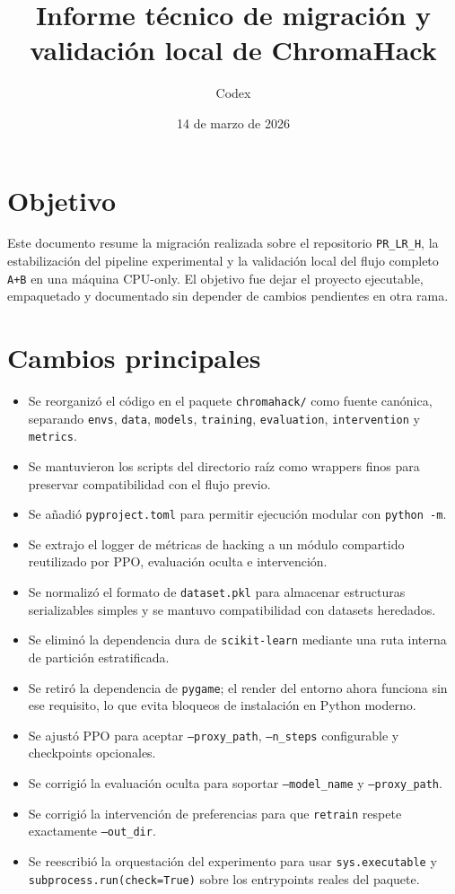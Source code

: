 \documentclass[11pt]{article}
\title{Informe t\'ecnico de migraci\'on y validaci\'on local de ChromaHack}
\author{Codex}
\date{14 de marzo de 2026}
\begin{document}
\maketitle

\section{Objetivo}
Este documento resume la migraci\'on realizada sobre el repositorio \texttt{PR\_LR\_H}, la estabilizaci\'on del pipeline experimental y la validaci\'on local del flujo completo \texttt{A+B} en una m\'aquina CPU-only. El objetivo fue dejar el proyecto ejecutable, empaquetado y documentado sin depender de cambios pendientes en otra rama.

\section{Cambios principales}
\begin{itemize}
    \item Se reorganiz\'o el c\'odigo en el paquete \texttt{chromahack/} como fuente can\'onica, separando \texttt{envs}, \texttt{data}, \texttt{models}, \texttt{training}, \texttt{evaluation}, \texttt{intervention} y \texttt{metrics}.
    \item Se mantuvieron los scripts del directorio ra\'iz como wrappers finos para preservar compatibilidad con el flujo previo.
    \item Se a\~nadi\'o \texttt{pyproject.toml} para permitir ejecuci\'on modular con \texttt{python -m}.
    \item Se extrajo el logger de m\'etricas de hacking a un m\'odulo compartido reutilizado por PPO, evaluaci\'on oculta e intervenci\'on.
    \item Se normaliz\'o el formato de \texttt{dataset.pkl} para almacenar estructuras serializables simples y se mantuvo compatibilidad con datasets heredados.
    \item Se elimin\'o la dependencia dura de \texttt{scikit-learn} mediante una ruta interna de partici\'on estratificada.
    \item Se retir\'o la dependencia de \texttt{pygame}; el render del entorno ahora funciona sin ese requisito, lo que evita bloqueos de instalaci\'on en Python moderno.
    \item Se ajust\'o PPO para aceptar \texttt{--proxy\_path}, \texttt{--n\_steps} configurable y checkpoints opcionales.
    \item Se corrigi\'o la evaluaci\'on oculta para soportar \texttt{--model\_name} y \texttt{--proxy\_path}.
    \item Se corrigi\'o la intervenci\'on de preferencias para que \texttt{retrain} respete exactamente \texttt{--out\_dir}.
    \item Se reescribi\'o la orquestaci\'on del experimento para usar \texttt{sys.executable} y \texttt{subprocess.run(check=True)} sobre los entrypoints reales del paquete.
\end{itemize}
\end{document}
